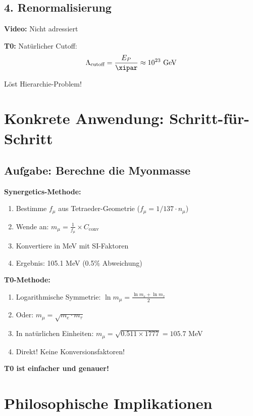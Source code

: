 	\subsection{4. Renormalisierung}
	
	\textbf{Video:} Nicht adressiert
	
	\textbf{T0:} Natürlicher Cutoff:
	\begin{equation}
		\Lambda_{\text{cutoff}} = \frac{E_P}{\xipar} \approx 10^{23} \text{ GeV}
	\end{equation}
	
	Löst Hierarchie-Problem!
	
	\section{Konkrete Anwendung: Schritt-für-Schritt}
	
	\subsection{Aufgabe: Berechne die Myonmasse}
	
	\textbf{Synergetics-Methode:}
	\begin{enumerate}
		\item Bestimme $f_\mu$ aus Tetraeder-Geometrie ($f_\mu = 1/137 \cdot n_\mu$)
		\item Wende an: $m_\mu = \frac{1}{f_\mu} \times C_{\text{conv}}$
		\item Konvertiere in MeV mit SI-Faktoren
		\item Ergebnis: 105.1 MeV (0.5\% Abweichung)
	\end{enumerate}
	
	\textbf{T0-Methode:}
	\begin{enumerate}
		\item Logarithmische Symmetrie: $\ln m_\mu = \frac{\ln m_e + \ln m_\tau}{2}$
		\item Oder: $m_\mu = \sqrt{m_e \cdot m_\tau}$
		\item In natürlichen Einheiten: $m_\mu = \sqrt{0.511 \times 1777} = 105.7$ MeV
		\item Direkt! Keine Konversionsfaktoren!
	\end{enumerate}
	
	\textbf{T0 ist einfacher und genauer!}
	
	\section{Philosophische Implikationen}
	
